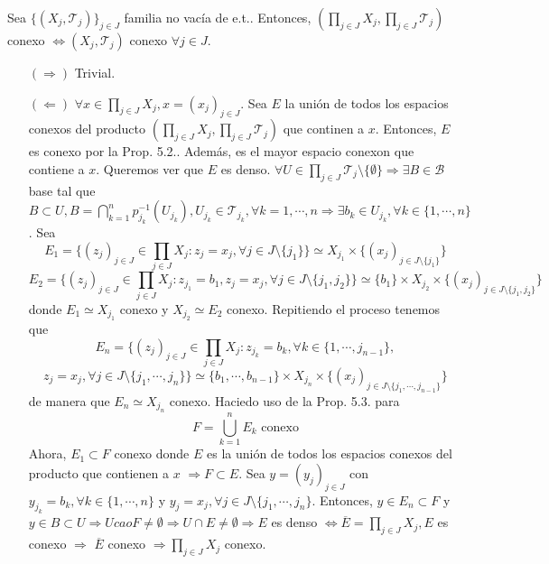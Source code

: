 \begin{prop}
  Sea $\{ ( X_{j}, \mathcal{T}_{j} ) \}_{j \in J}$ familia no vacía de e.t.. Entonces, $( \prod_{j \in J} X_{j}, \prod_{j \in J} \mathcal{T}_{j} )$ conexo $\Leftrightarrow ( X_{j}, \mathcal{T}_{j} )$ conexo $\forall j \in J$.
\end{prop}

\begin{dem}
  \begin{enumerate}[label=(\roman*)]
    \item []
    \item [$(\Rightarrow)$] Trivial.
    \item [$(\Leftarrow)$] $\forall x \in \prod_{j \in J} X_{j}, x = ( x_{j} )_{j \in J}$. Sea $E$ la unión de todos los espacios conexos del producto $( \prod_{j \in J} X_{j}, \prod_{j \in J} \mathcal{T}_{j} )$ que continen a $x$. Entonces, $E$ es conexo por la Prop. 5.2.. Además, es el mayor espacio conexon que contiene a $x$. Queremos ver que $E$ es denso. $\forall U \in \prod_{j \in J} \mathcal{T}_{j} \setminus \{  \emptyset \} \Rightarrow \exists B \in \mathcal{B}$ base tal que $B \subset U, B = \bigcap_{k = 1}^{n} p_{j_{k}}^{-1}(U_{j_{k}}), U_{j_{k}} \in \mathcal{T}_{j_{k}}, \forall k = 1, \cdots, n \Rightarrow \exists b_{k} \in U_{j_{k}}, \forall k \in \{ 1, \cdots, n \}$. Sea 
      \[ 
        E_{1} = \{ ( z_{j} )_{j \in J} \in \prod_{j \in J} X_{j} : z_{j} = x_{j}, \forall j \in J \setminus \{ j_{1} \}\} \simeq X_{j_{1}} \times \{ ( x_{j} )_{j \in J \setminus \{ j_{1} \} }\}
      \] 
      \[ 
        E_{2} = \{ ( z_{j} )_{j \in J} \in \prod_{j \in J} X_{j} : z_{j_{1}} = b_{1},  z_{j} = x_{j}, \forall j \in J \setminus \{ j_{1}, j_{2} \}\} \simeq \{ b_{1} \} \times X_{j_{2}} \times \{ ( x_{j} )_{j \in J \setminus \{ j_{1}, j_{2} \} }\}
      \] 
      donde $E_{1} \simeq X_{j_{1}}$ conexo y $X_{j_{2}} \simeq E_{2}$ conexo. Repitiendo el proceso tenemos que
      \[ 
        E_{n} = \{ ( z_{j} )_{j \in J} \in \prod_{j \in J} X_{j} : z_{j_{k}} = b_{k}, \forall k \in \{ 1, \cdots, j_{n-1} \},
      \] 
      \[ 
        z_{j} = x_{j}, \forall j \in J \setminus \{ j_{1}, \cdots, j_{n} \}\} \simeq \{ b_{1}, \cdots, b_{n-1} \} \times X_{j_{n}} \times \{ ( x_{j} )_{j \in J \setminus \{ j_{1}, \cdots, j_{n-1} \} }\}
      \] 
      de manera que $E_{n} \simeq X_{j_{n}}$ conexo. Haciedo uso de la Prop. 5.3. para
      \[ 
        F = \bigcup_{k = 1}^{n} E_{k} \text{ conexo} 
      \] 
      Ahora, $E_{1} \subset F$ conexo donde $E$ es la unión de todos los espacios conexos del producto que contienen a $x$ $\Rightarrow F \subset E$. Sea $ y = ( y_{j} )_{j \in J}$ con $y_{j_{k}} = b_{k}, \forall k \in \{ 1, \cdots, n \}$ y $y_{j} = x_{j}, \forall j \in J \setminus \{ j_{1}, \cdots, j_{n} \}$. Entonces, $y \in E_{n} \subset F$ y $y \in B \subset U \Rightarrow U cao F \neq \emptyset \Rightarrow U \cap E \neq \emptyset \Rightarrow E$ es denso $\Leftrightarrow \overline{E} = \prod_{j \in J} X_{j}, E$ es conexo $\Rightarrow$ $\overline{E}$ conexo $\Rightarrow \prod_{j \in J} X_{j}$ conexo.
  \end{enumerate}
\end{dem}

